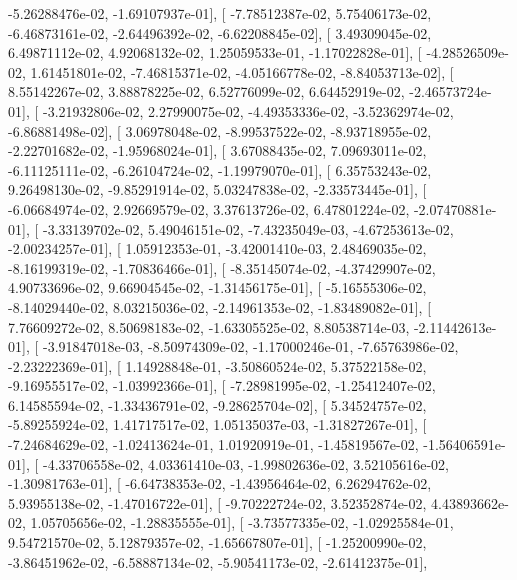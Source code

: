 \documentclass{article}
\begin{document}
         -5.26288476e-02,  -1.69107937e-01],
       [ -7.78512387e-02,   5.75406173e-02,  -6.46873161e-02,
         -2.64496392e-02,  -6.62208845e-02],
       [  3.49309045e-02,   6.49871112e-02,   4.92068132e-02,
          1.25059533e-01,  -1.17022828e-01],
       [ -4.28526509e-02,   1.61451801e-02,  -7.46815371e-02,
         -4.05166778e-02,  -8.84053713e-02],
       [  8.55142267e-02,   3.88878225e-02,   6.52776099e-02,
          6.64452919e-02,  -2.46573724e-01],
       [ -3.21932806e-02,   2.27990075e-02,  -4.49353336e-02,
         -3.52362974e-02,  -6.86881498e-02],
       [  3.06978048e-02,  -8.99537522e-02,  -8.93718955e-02,
         -2.22701682e-02,  -1.95968024e-01],
       [  3.67088435e-02,   7.09693011e-02,  -6.11125111e-02,
         -6.26104724e-02,  -1.19979070e-01],
       [  6.35753243e-02,   9.26498130e-02,  -9.85291914e-02,
          5.03247838e-02,  -2.33573445e-01],
       [ -6.06684974e-02,   2.92669579e-02,   3.37613726e-02,
          6.47801224e-02,  -2.07470881e-01],
       [ -3.33139702e-02,   5.49046151e-02,  -7.43235049e-03,
         -4.67253613e-02,  -2.00234257e-01],
       [  1.05912353e-01,  -3.42001410e-03,   2.48469035e-02,
         -8.16199319e-02,  -1.70836466e-01],
       [ -8.35145074e-02,  -4.37429907e-02,   4.90733696e-02,
          9.66904545e-02,  -1.31456175e-01],
       [ -5.16555306e-02,  -8.14029440e-02,   8.03215036e-02,
         -2.14961353e-02,  -1.83489082e-01],
       [  7.76609272e-02,   8.50698183e-02,  -1.63305525e-02,
          8.80538714e-03,  -2.11442613e-01],
       [ -3.91847018e-03,  -8.50974309e-02,  -1.17000246e-01,
         -7.65763986e-02,  -2.23222369e-01],
       [  1.14928848e-01,  -3.50860524e-02,   5.37522158e-02,
         -9.16955517e-02,  -1.03992366e-01],
       [ -7.28981995e-02,  -1.25412407e-02,   6.14585594e-02,
         -1.33436791e-02,  -9.28625704e-02],
       [  5.34524757e-02,  -5.89255924e-02,   1.41717517e-02,
          1.05135037e-03,  -1.31827267e-01],
       [ -7.24684629e-02,  -1.02413624e-01,   1.01920919e-01,
         -1.45819567e-02,  -1.56406591e-01],
       [ -4.33706558e-02,   4.03361410e-03,  -1.99802636e-02,
          3.52105616e-02,  -1.30981763e-01],
       [ -6.64738353e-02,  -1.43956464e-02,   6.26294762e-02,
          5.93955138e-02,  -1.47016722e-01],
       [ -9.70222724e-02,   3.52352874e-02,   4.43893662e-02,
          1.05705656e-02,  -1.28835555e-01],
       [ -3.73577335e-02,  -1.02925584e-01,   9.54721570e-02,
          5.12879357e-02,  -1.65667807e-01],
       [ -1.25200990e-02,  -3.86451962e-02,  -6.58887134e-02,
         -5.90541173e-02,  -2.61412375e-01],
\end{document}
